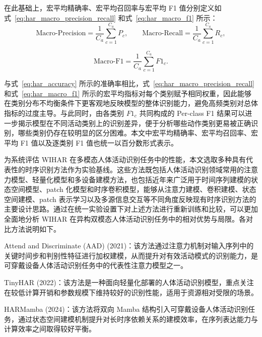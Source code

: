 在此基础上，宏平均精确率、宏平均召回率与宏平均 F1 值分别定义如式~\eqref{eq:har_macro_precision_recall} 和式~\eqref{eq:har_macro_f1} 所示：
\begin{equation}
\mathrm{Macro\text{-}Precision} = \frac{1}{C_a}\sum_{c=1}^{C_a} P_c,
\qquad
\mathrm{Macro\text{-}Recall} = \frac{1}{C_a}\sum_{c=1}^{C_a} R_c,
\label{eq:har_macro_precision_recall}
\end{equation}

\begin{equation}
\mathrm{Macro\text{-}F1} = \frac{1}{C_a}\sum_{c=1}^{C_a} F1_c.
\label{eq:har_macro_f1}
\end{equation}

与式~\eqref{eq:har_accuracy} 所示的准确率相比，式~\eqref{eq:har_macro_precision_recall} 和式~\eqref{eq:har_macro_f1} 所示的宏平均指标对每个类别赋予相同权重，因此能够在类别分布不均衡条件下更客观地反映模型的整体识别能力，避免高频类别对总体指标的过度主导。与此同时，由各类别 $F1_c$ 共同构成的 Per-class F1 结果可以进一步揭示模型在不同活动类别上的识别差异，便于分析哪些动作类别更易被正确识别，哪些类别仍存在较明显的区分困难。本文中宏平均精确率、宏平均召回率、宏平均 F1 值以及逐类别 F1 值也统一以百分数形式表示。


为系统评估 WIHAR 在多模态人体活动识别任务中的性能，本文选取多种具有代表性的时序识别方法作为实验基线。这些方法既包括人体活动识别领域常用的注意力模型、轻量化模型和多设备建模方法，也包括近年来广泛用于时间序列建模的状态空间模型、patch 化模型和时序卷积模型，能够从注意力建模、卷积建模、状态空间建模、patch 表示学习以及多源信息交互等不同角度反映现有时序识别方法的主要设计思路。通过在统一实验设置下对上述方法进行重新训练和比较，可以更加全面地分析 WIHAR 在异构双模态人体活动识别任务中的相对优势与局限。各对比方法说明如下。

Attend and Discriminate (AAD)\cite{abedin2021attend} (2021)：该方法通过注意力机制对输入序列中的关键时间步和判别性特征进行加权建模，从而提升对有效活动模式的识别能力，是可穿戴设备人体活动识别任务中的代表性注意力模型之一。

TinyHAR\cite{zhou2022tinyhar} (2022)：该方法是一种面向轻量化部署的人体活动识别模型，重点关注在较低计算开销和参数规模下维持较好的识别性能，适用于资源相对受限的场景。

HARMamba\cite{li2024harmamba} (2024)：该方法将双向 Mamba 结构引入可穿戴设备人体活动识别任务，通过状态空间建模机制提升对长时序依赖关系的建模效率，在序列表达能力与计算效率之间取得较好平衡。


